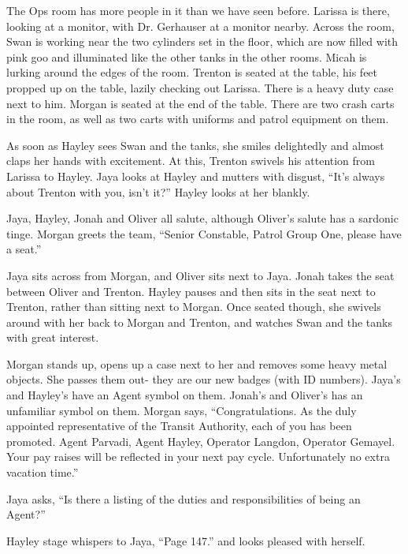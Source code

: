 The Ops room has more people in it than we have seen before.  Larissa is there, looking at a monitor, with Dr. Gerhauser at a monitor nearby.  Across the room, Swan is working near the two cylinders set in the floor, which are now filled with pink goo and illuminated like the other tanks in the other rooms.  Micah is lurking around the edges of the room.  Trenton is seated at the table, his feet propped up on the table, lazily checking out Larissa.  There is a heavy duty case next to him.  Morgan is seated at the end of the table.  There are two crash carts in the room, as well as two carts with uniforms and patrol equipment on them.



As soon as Hayley sees Swan and the tanks, she smiles delightedly and almost claps her hands with excitement.  At this, Trenton swivels his attention from Larissa to Hayley.  Jaya looks at Hayley and mutters with disgust, ``It's always about Trenton with you, isn't it?''  Hayley looks at her blankly.



Jaya, Hayley, Jonah and Oliver all salute, although Oliver's salute has a sardonic tinge.  Morgan greets the team, ``Senior Constable, Patrol Group One, please have a seat.''



Jaya sits across from Morgan, and Oliver sits next to Jaya.  Jonah takes the seat between Oliver and Trenton.  Hayley pauses and then sits in the seat next to Trenton, rather than sitting next to Morgan.  Once seated though, she swivels around with her back to Morgan and Trenton, and watches Swan and the tanks with great interest.



Morgan stands up, opens up a case next to her and removes some heavy metal objects.  She passes them out- they are our new badges (with ID numbers).  Jaya's and Hayley's have an Agent symbol on them.  Jonah's and Oliver's has an unfamiliar symbol on them.  Morgan says, ``Congratulations. As the duly appointed representative of the Transit Authority, each of you has been promoted.  Agent Parvadi, Agent Hayley, Operator Langdon, Operator Gemayel.  Your pay raises will be reflected in your next pay cycle.  Unfortunately no extra vacation time.''



Jaya asks, ``Is there a listing of the duties and responsibilities of being an Agent?''

Hayley stage whispers to Jaya, ``Page 147.''  and looks pleased with herself.

